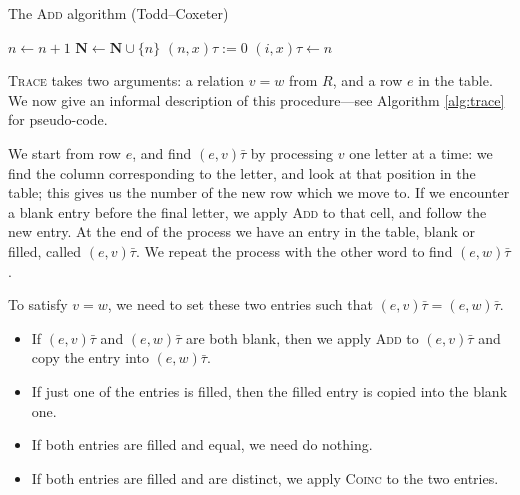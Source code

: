 \begin{algorithm}
\caption{The \textsc{Add} algorithm (Todd--Coxeter)}
\label{alg:add}
\begin{algorithmic}[1]
\State $n \gets n + 1$
\State $\mathbf{N} \gets \mathbf{N} \cup \{n\}$
  \State $(n, x)\tau := 0$
\EndFor
\State $(i, x)\tau \gets n$
\EndProcedure
\end{algorithmic}
\end{algorithm}

\textsc{Trace} takes two arguments: a relation $v=w$ from $R$, and a row $e$
in the table.  We now give an informal description of this procedure---see
Algorithm \ref{alg:trace} for pseudo-code.

We start from row $e$, and find $(e, v)\bar\tau$ by processing $v$ one letter at a time: we
find the column corresponding to the letter, and look at that position in the
table; this gives us the number of the new row which we move to.  If we
encounter a blank entry before the final letter, we apply \textsc{Add} to that
cell, and follow the new entry.  At the end of the process we have an entry in
the table, blank or filled, called $(e, v)\bar\tau$.  We repeat the
process with the other word to find $(e, w)\bar\tau$.

To satisfy $v=w$, we need to set these two entries such that
$(e, v)\bar\tau = (e, w)\bar\tau$.
\begin{itemize}
\item If $(e, v)\bar\tau$ and $(e, w)\bar\tau$ are both blank, then we apply
  \textsc{Add} to $(e, v)\bar\tau$ and copy the entry into $(e, w)\bar\tau$.
\item If just one of the entries is filled, then the filled entry is copied into
  the blank one.
\item If both entries are filled and equal, we need do nothing.
\item If both entries are filled and are distinct, we apply \textsc{Coinc} to
  the two entries.
\end{itemize}

